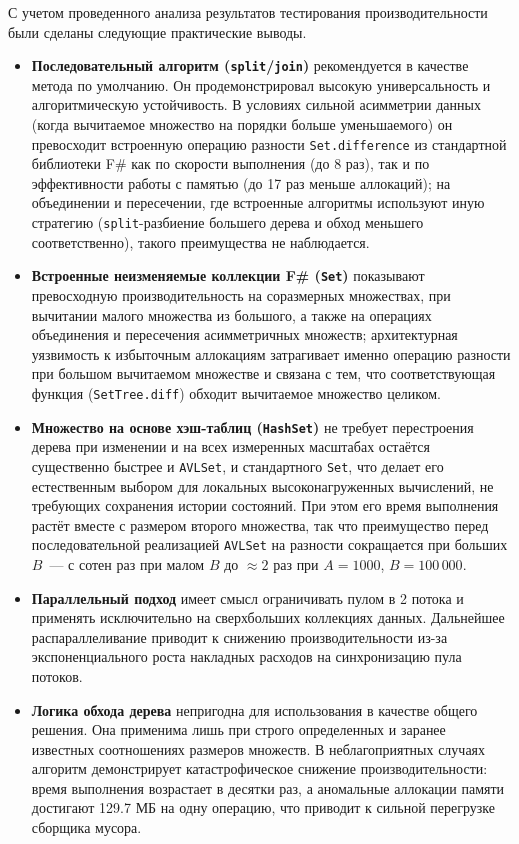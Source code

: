 \documentclass[a4paper,12pt]{article}
\begin{document}
С учетом проведенного анализа результатов тестирования производительности были сделаны следующие практические выводы.
\begin{itemize}
    \item \textbf{Последовательный алгоритм (\texttt{split}/\texttt{join})} рекомендуется в качестве метода по умолчанию. Он продемонстрировал высокую универсальность и алгоритмическую устойчивость. В условиях сильной асимметрии данных (когда вычитаемое множество на порядки больше уменьшаемого) он превосходит встроенную операцию разности \verb|Set.difference| из стандартной библиотеки F\# как по скорости выполнения (до 8 раз), так и по эффективности работы с памятью (до 17 раз меньше аллокаций); на объединении и пересечении, где встроенные алгоритмы используют иную стратегию (\verb|split|-разбиение большего дерева и обход меньшего соответственно), такого преимущества не наблюдается.
    \item \textbf{Встроенные неизменяемые коллекции F\# (\texttt{Set})} показывают превосходную производительность на соразмерных множествах, при вычитании малого множества из большого, а также на операциях объединения и пересечения асимметричных множеств; архитектурная уязвимость к избыточным аллокациям затрагивает именно операцию разности при большом вычитаемом множестве и связана с тем, что соответствующая функция (\texttt{SetTree.diff}) обходит вычитаемое множество целиком.
    \item \textbf{Множество на основе хэш-таблиц (\texttt{HashSet})} не требует перестроения дерева при изменении и на всех измеренных масштабах остаётся существенно быстрее и \texttt{AVLSet}, и стандартного \texttt{Set}, что делает его естественным выбором для локальных высоконагруженных вычислений, не требующих сохранения истории состояний. При этом его время выполнения растёт вместе с размером второго множества, так что преимущество перед последовательной реализацией \texttt{AVLSet} на разности сокращается при больших $B$~--- с сотен раз при малом $B$ до $\approx 2$ раз при $A=1000$, $B=100\,000$.
    \item \textbf{Параллельный подход} имеет смысл ограничивать пулом в 2 потока и применять исключительно на сверхбольших коллекциях данных. Дальнейшее распараллеливание приводит к снижению производительности из-за экспоненциального роста накладных расходов на синхронизацию пула потоков.
    \item \textbf{Логика обхода дерева} непригодна для использования в качестве общего решения. Она применима лишь при строго определенных и заранее известных соотношениях размеров множеств. В неблагоприятных случаях алгоритм демонстрирует катастрофическое снижение производительности: время выполнения возрастает в десятки раз, а аномальные аллокации памяти достигают 129.7 МБ на одну операцию, что приводит к сильной перегрузке сборщика мусора.
\end{itemize}
\end{document}
